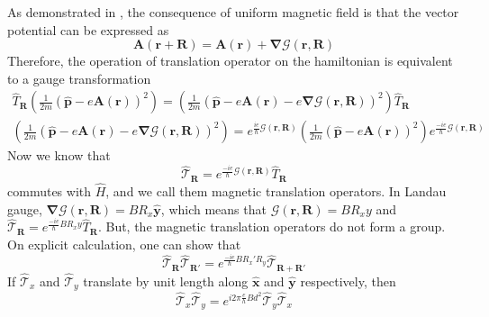 As demonstrated in \cite{jain2007composite,kohmoto1985topological}, the consequence of uniform magnetic field is that the vector potential can be expressed as
\begin{equation*}
 \mathbf{A}(\mathbf{r} + \mathbf{R}) = \mathbf{A}(\mathbf{r}) + \bm{\nabla}\mathcal{G}(\mathbf{r}, \mathbf{R})
\end{equation*}
Therefore, the operation of translation operator on the hamiltonian is equivalent to a gauge transformation
\begin{gather}
 \hat{T}_{\mathbf{R}}\left(\frac{1}{2m}(\hat{\mathbf{p}} - e\mathbf{A}(\mathbf{r}))^2\right) = \left(\frac{1}{2m}(\hat{\mathbf{p}} - e\mathbf{A}(\mathbf{r}) - e\bm{\nabla}\mathcal{G}(\mathbf{r}, \mathbf{R}))^2\right)\hat{T}_{\mathbf{R}} \\
 \label{chap_6:magneticgaugetransform}\left(\frac{1}{2m}(\hat{\mathbf{p}} - e\mathbf{A}(\mathbf{r}) - e\bm{\nabla}\mathcal{G}(\mathbf{r}, \mathbf{R}))^2\right) = e^{\frac{ie}{\hbar}\mathcal{G}(\mathbf{r}, \mathbf{R})}\left(\frac{1}{2m}(\hat{\mathbf{p}} - e\mathbf{A}(\mathbf{r}))^2\right)e^{\frac{-ie}{\hbar}\mathcal{G}(\mathbf{r}, \mathbf{R})}
\end{gather}
Now we know that
\begin{equation}
 \hat{\mathcal{T}}_{\mathbf{R}} = e^{\frac{-ie}{\hbar}\mathcal{G}(\mathbf{r}, \mathbf{R})}\hat{T}_{\mathbf{R}}
\end{equation} commutes with $\hat{H}$, and we call them magnetic translation operators.
In Landau gauge, $\bm{\nabla}\mathcal{G}(\mathbf{r}, \mathbf{R}) = BR_{x}\hat{\mathbf{y}}$, which means that $\mathcal{G}(\mathbf{r}, \mathbf{R}) = BR_{x}y$
and $\hat{\mathcal{T}}_{\mathbf{R}} = e^{\frac{-ie}{\hbar}BR_{x}y}\hat{T}_{\mathbf{R}}$.
But, the magnetic translation operators do not form a group. On explicit calculation, one can show that
\begin{equation*}
 \hat{\mathcal{T}}_{\mathbf{R}}\hat{\mathcal{T}}_{\mathbf{R}'} = e^{\frac{-ie}{\hbar}BR_{x}'R_{y}}\hat{\mathcal{T}}_{\mathbf{R} + \mathbf{R}'}
\end{equation*} If $\hat{\mathcal{T}}_{x}$ and $\hat{\mathcal{T}}_{y}$ translate by unit length along $\hat{\mathbf{x}}$ and $\hat{\mathbf{y}}$ respectively, then
\begin{equation*}
 \hat{\mathcal{T}}_{x}\hat{\mathcal{T}}_{y} = e^{i2\pi\frac{e}{h}Bd^2}\hat{\mathcal{T}}_{y}\hat{\mathcal{T}}_{x}
\end{equation*}

